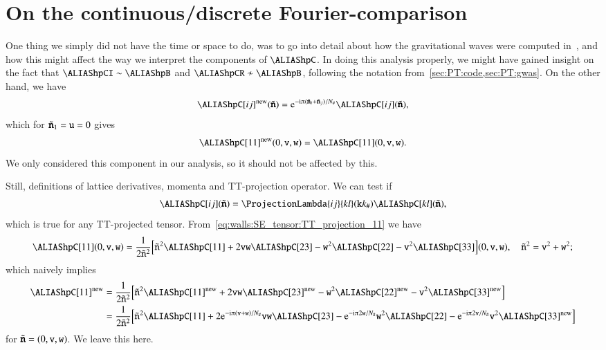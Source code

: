 \section{On the continuous/discrete Fourier-comparison}\label{app:misc:CFT_DFT}
    One thing we simply did not have the time or space to do, was to go into detail about how the gravitational waves were computed in~\asgrd, and how this might affect the way we interpret the components of $\hpC$. 
    In doing this analysis properly, we might have gained insight on the fact that $\hpCI \sim \hpB$ and $\hpCR \not\sim \hpB$, following the notation from~\cref{sec:PT:code,sec:PT:gwas}. On the other hand, we have~\citep{adamekGevolutionCosmologicalNbody2016}
    \begin{equation}
        \hpC[ij]\ap{new}(\lcoordk) = \eu[-\im \ppi (\lcoordk_i + \lcoordk_j)/N_\# ] \hpC[ij](\lcoordk),
    \end{equation}
    which for $\tilde{\boldsymbol{\mathtt{n}}}_1 =\mathtt{u}= 0$ gives 
    \begin{equation}
        \hpC[11]\ap{new}(0,\lcoord{v},\lcoord{w}) = \hpC[11](0,\lcoord{v},\lcoord{w}).
    \end{equation}
    We only considered this component in our analysis, so it should not be affected by this.

    Still, definitions of lattice derivatives, momenta and TT-projection operator. We can test if
    \begin{equation}
        \hpC[ij](\lcoordk) =  \ProjectionLambda{ij}{kl}(\lcoord{k}k_\#) \hpC[kl](\lcoordk),
    \end{equation}
    which is true for any TT-projected tensor. From~\cref{eq:walls:SE_tensor:TT_projection_11} we have
    \begin{equation}
        \hpC[11](0,\lcoord{v},\lcoord{w}) = \frac{1}{2\tilde{\lcoord{n}}^2}  \bclosed{\tilde{\lcoord{n}}^2 \hpC[11] + 2 \lcoord{v}\lcoord{w}\hpC[23] - \lcoord{w}^2 \hpC[22] - \lcoord{v}^2 \hpC[33]  }(0,\lcoord{v},\lcoord{w}) , \quad \tilde{\lcoord{n}}^2 = \lcoord{v}^2 + \lcoord{w}^2;
    \end{equation}
    which naively implies
    \begin{align}
        \hpC[11]\ap{new}&= \frac{1}{2\tilde{\lcoord{n}}^2}  \bclosed{\tilde{\lcoord{n}}^2 \hpC[11]\ap{new} + 2 \lcoord{v}\lcoord{w}\hpC[23]\ap{new} - \lcoord{w}^2 \hpC[22]\ap{new} - \lcoord{v}^2 \hpC[33]\ap{new}  }\nonumber \\
        & = \frac{1}{2\tilde{\lcoord{n}}^2} \bclosed{\tilde{\lcoord{n}}^2 \hpC[11]+ 2 \eu[-\im \ppi (\lcoord{v}+\lcoord{w})/N_\#] \lcoord{v}\lcoord{w}\hpC[23] - \eu[-\im \ppi 2\lcoord{w}/N_\#] \lcoord{w}^2 \hpC[22] - \eu[-\im \ppi 2\lcoord{v}/N_\#]\lcoord{v}^2 \hpC[33]\ap{new}  }
    \end{align}
    for $\tilde{\boldsymbol{\mathtt{n}}} = (0,\mathtt{v},\mathtt{w})$. We leave this here. %
    

